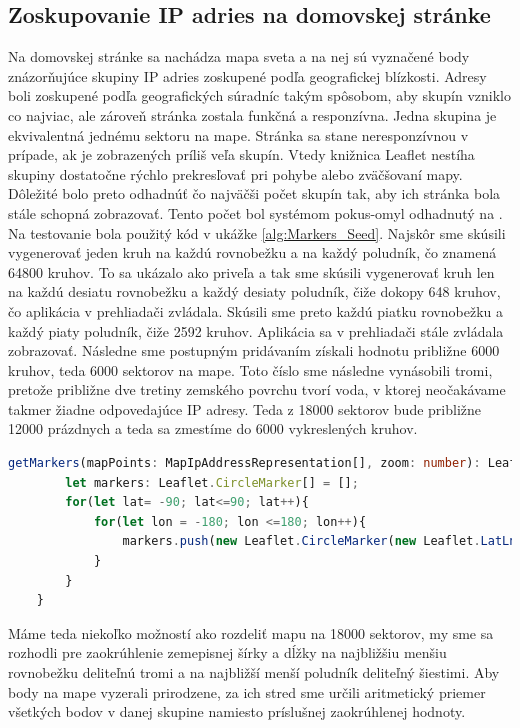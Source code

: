 \subsection{Zoskupovanie IP adries na domovskej stránke}
Na domovskej stránke sa nachádza mapa sveta a na nej sú vyznačené body znázorňujúce skupiny IP adries zoskupené podľa geografickej blízkosti. 
Adresy boli zoskupené podľa geografických súradníc takým spôsobom, aby skupín vzniklo co najviac, ale zároveň stránka zostala funkčná a responzívna. 
Jedna skupina je ekvivalentná jednému sektoru na mape.
Stránka sa stane neresponzívnou v prípade, ak je zobrazených príliš veľa skupín. Vtedy knižnica Leaflet nestíha skupiny dostatočne rýchlo prekresľovať pri 
pohybe alebo zväčšovaní mapy. Dôležité bolo preto odhadnúť čo najväčši počet skupín tak, aby ich stránka bola stále schopná zobrazovať. Tento počet bol 
systémom pokus-omyl odhadnutý na  . Na testovanie bola použitý kód v ukážke \ref{alg:Markers_Seed}. Najskôr sme skúsili vygenerovať jeden kruh na každú rovnobežku 
a na každý poludník, čo znamená 64800 kruhov. To sa ukázalo ako priveľa a tak sme skúsili vygenerovať kruh len na každú desiatu rovnobežku a každý desiaty poludník, 
čiže dokopy 648 kruhov, čo aplikácia v prehliadači zvládala. Skúsili sme preto každú piatku rovnobežku a každý piaty poludník, čiže 2592 kruhov. Aplikácia sa
v prehliadači stále zvládala zobrazovať. Následne sme postupným pridávaním získali hodnotu približne 6000 kruhov, teda 6000 sektorov na mape. Toto číslo sme 
následne vynásobili tromi, pretože približne dve tretiny zemského povrchu tvorí voda, v ktorej neočakávame takmer žiadne odpovedajúce IP adresy. Teda z 18000 
sektorov bude približne 12000 prázdnych a teda sa zmestíme do 6000 vykreslených kruhov. 

\begin{lstlisting}[language={TypeScript},caption={Ukážka kódu použitého na testovanie počtu možných skupín},label=alg:Markers_Seed]
    getMarkers(mapPoints: MapIpAddressRepresentation[], zoom: number): Leaflet.CircleMarker[] {
        let markers: Leaflet.CircleMarker[] = [];
        for(let lat= -90; lat<=90; lat++){
            for(let lon = -180; lon <=180; lon++){
                markers.push(new Leaflet.CircleMarker(new Leaflet.LatLng(lat, lon)))
            }
        }
    }
\end{lstlisting}

Máme teda niekoľko možností ako rozdeliť mapu na 18000 sektorov, my sme sa rozhodli pre zaokrúhlenie zemepisnej šírky a dĺžky na najbližšiu menšiu rovnobežku 
deliteľnú tromi a na najbližší menší poludník deliteľný šiestimi. Aby body na mape vyzerali prirodzene, za ich stred sme určili aritmetický priemer všetkých 
bodov v danej skupine namiesto príslušnej zaokrúhlenej hodnoty.

